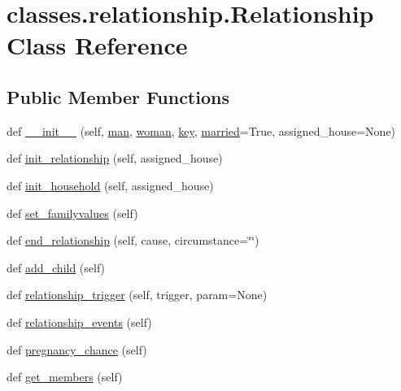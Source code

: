 \hypertarget{classclasses_1_1relationship_1_1Relationship}{}\section{classes.\+relationship.\+Relationship Class Reference}
\label{classclasses_1_1relationship_1_1Relationship}
\subsection*{Public Member Functions}
\begin{DoxyCompactItemize}
\item 
def \hyperlink{classclasses_1_1relationship_1_1Relationship_a4ba683d98c8f47b1ba3e759218f02735}{\+\_\+\+\_\+init\+\_\+\+\_\+} (self, \hyperlink{classclasses_1_1relationship_1_1Relationship_adbaa51bb0a498b8e046a3f9b9c59b4a8}{man}, \hyperlink{classclasses_1_1relationship_1_1Relationship_aa138a40b9cf69e7f4a4601d89b3a2850}{woman}, \hyperlink{classclasses_1_1relationship_1_1Relationship_a128c668cea8559dd35d884b369135b26}{key}, \hyperlink{classclasses_1_1relationship_1_1Relationship_a113a6a0cf7492e28fea82c208ba17129}{married}=True, assigned\+\_\+house=None)
\item 
def \hyperlink{classclasses_1_1relationship_1_1Relationship_a41b6be203221fcb7449859821e072f15}{init\+\_\+relationship} (self, assigned\+\_\+house)
\item 
def \hyperlink{classclasses_1_1relationship_1_1Relationship_a677a8b8bbd8d0db307054392cf8e5162}{init\+\_\+household} (self, assigned\+\_\+house)
\item 
def \hyperlink{classclasses_1_1relationship_1_1Relationship_aeae6e9c64ec1373ede90e226f2333bfe}{set\+\_\+familyvalues} (self)
\item 
def \hyperlink{classclasses_1_1relationship_1_1Relationship_a5965a52b567193788d75695c44a7150a}{end\+\_\+relationship} (self, cause, circumstance=\char`\"{}\char`\"{})
\item 
def \hyperlink{classclasses_1_1relationship_1_1Relationship_a035ec849e088f60ccdeebbb9310a0bc4}{add\+\_\+child} (self)
\item 
def \hyperlink{classclasses_1_1relationship_1_1Relationship_a947eecc834955ad24b84a36eadf501ef}{relationship\+\_\+trigger} (self, trigger, param=None)
\item 
def \hyperlink{classclasses_1_1relationship_1_1Relationship_aa17f3d4f6365f6484db1df8525960e51}{relationship\+\_\+events} (self)
\item 
def \hyperlink{classclasses_1_1relationship_1_1Relationship_a55bd5cf5f2ed15d4a0f0f541cd29aed2}{pregnancy\+\_\+chance} (self)
\item 
def \hyperlink{classclasses_1_1relationship_1_1Relationship_a7a31fc0d9389a33cff4b2e8114a25959}{get\+\_\+members} (self)
\end{DoxyCompactItemize}
